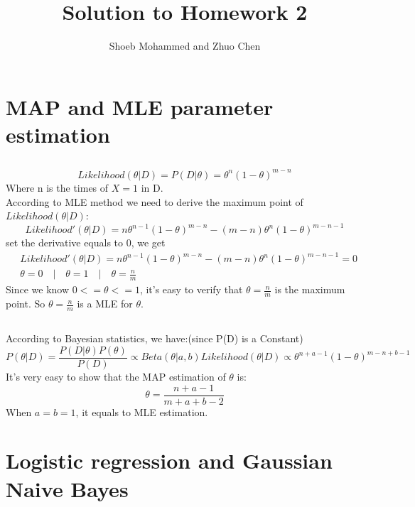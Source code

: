 \documentclass{article}
\begin{document}
\title{Solution to Homework 2}
\author{Shoeb Mohammed and Zhuo Chen}
\maketitle

\newcommand{\QEDA}{\hfill\ensuremath{\blacksquare}}
\newcommand{\QEDB}{\hfill\ensuremath{\square}}

\section{MAP and MLE parameter estimation}
\subsection{}
\begin{equation}
Likelihood(\theta|D)=P(D|\theta)=\theta^n(1-\theta)^{m-n}
\end{equation}
Where n is the times of $X=1$ in D.\\
According to MLE method we need to derive the maximum point of $Likelihood(\theta|D)$:
\begin{equation}
Likelihood'(\theta|D)=n\theta^{n-1}(1-\theta)^{m-n}-(m-n)\theta^n(1-\theta)^{m-n-1}
\end{equation}
set the derivative equals to 0, we get
\begin{align}
& Likelihood'(\theta|D)=n\theta^{n-1}(1-\theta)^{m-n}-(m-n)\theta^n(1-\theta)^{m-n-1}=0\\
&\theta=0 \quad|\quad \theta=1 \quad|\quad \theta=\frac{n}{m}
\end{align}
Since we know $0<=\theta<=1$, it's easy to verify that $\theta=\frac{n}{m}$ is the maximum point. So $\theta=\frac{n}{m}$ is a MLE for $\theta$.
\subsection{}
According to Bayesian statistics, we have:(since P(D) is a Constant)
\begin{equation}
P(\theta|D)=\frac{P(D|\theta)P(\theta)}{P(D)}\propto Beta(\theta|a,b)Likelihood(\theta|D)\propto\theta^{n+a-1}(1-\theta)^{m-n+b-1}
\end{equation}
It's very easy to show that the MAP estimation of $\theta$ is:
\begin{equation}
\theta=\frac{n+a-1}{m+a+b-2}
\end{equation}
When $a=b=1$, it equals to MLE estimation.
\section{Logistic regression and Gaussian Naive Bayes}
\end{document}
